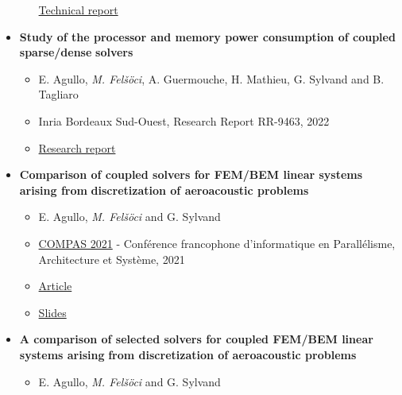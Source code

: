 \documentclass[a4paper, 11pt]{article}
\begin{document}
\begin{itemize}
\begin{itemize}
\begin{center}
\end{center} \href{https://hal.inria.fr/hal-03565692/document}{Technical
report}
\end{itemize}
\item \textbf{Study of the processor and memory power consumption of coupled sparse/dense}
\textbf{solvers}
\begin{itemize}
\item E. Agullo, \emph{M. Felšöci}, A. Guermouche, H. Mathieu, G. Sylvand and B.
Tagliaro
\item Inria Bordeaux Sud-Ouest, Research Report RR-9463, 2022
\item \begin{center}
\end{center} \href{https://hal.inria.fr/hal-03589695/document}{Research
report}
\end{itemize}
\item \textbf{Comparison of coupled solvers for FEM/BEM linear systems arising from}
\textbf{discretization of aeroacoustic problems}
\begin{itemize}
\item E. Agullo, \emph{M. Felšöci} and G. Sylvand
\item \href{https://2021.compas-conference.fr/}{COMPAS 2021} - Conférence francophone
d’informatique en Parallélisme, Architecture et Système, 2021
\item \begin{center}
\end{center} \href{https://hal.inria.fr/hal-03264472/document}{Article}
\item \begin{center}
\end{center} \begin{center}
\end{center}
\href{https://thesis-mfelsoci.gitlabpages.inria.fr/thesis/slides/compas-2021.pdf}{Slides}
\end{itemize}
\item \textbf{A comparison of selected solvers for coupled FEM/BEM linear systems arising}
\textbf{from discretization of aeroacoustic problems}
\begin{itemize}
\item E. Agullo, \emph{M. Felšöci} and G. Sylvand

\end{itemize}
\end{itemize}
\end{document}
